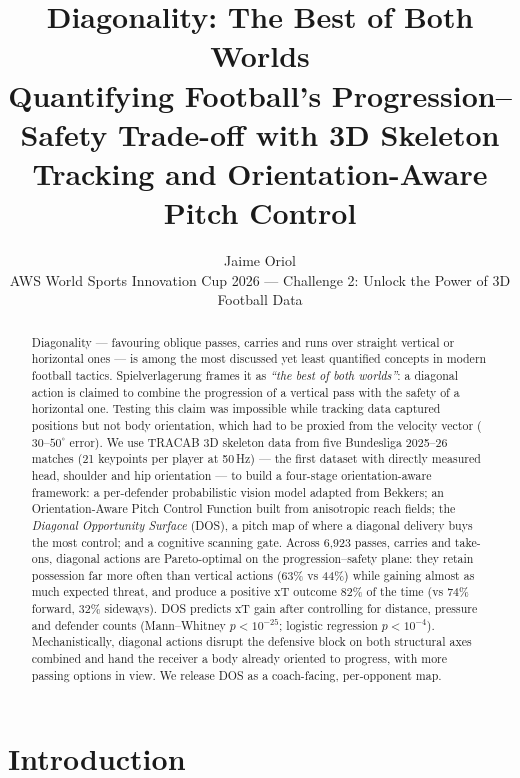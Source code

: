 \documentclass[11pt]{article}
\title{\textbf{Diagonality: The Best of Both Worlds}\\[4pt]
\large Quantifying Football's Progression--Safety Trade-off with 3D Skeleton
Tracking and Orientation-Aware Pitch Control}
\author{Jaime Oriol\\
\small AWS World Sports Innovation Cup 2026 --- Challenge 2: Unlock the Power of 3D Football Data}
\date{}
\begin{document}
\maketitle

\begin{abstract}
\noindent
Diagonality --- favouring oblique passes, carries and runs over straight
vertical or horizontal ones --- is among the most discussed yet least
quantified concepts in modern football tactics. Spielverlagerung frames it
as \emph{``the best of both worlds''}: a diagonal action is claimed to
combine the progression of a vertical pass with the safety of a horizontal
one. Testing this claim was impossible while tracking data captured
positions but not body orientation, which had to be proxied from the
velocity vector ($30$--$50^\circ$ error). We use TRACAB 3D skeleton data
from five Bundesliga 2025--26 matches (21 keypoints per player at
50\,Hz) --- the first dataset with directly measured head, shoulder and hip
orientation --- to build a four-stage orientation-aware framework: a
per-defender probabilistic vision model adapted from Bekkers; an
Orientation-Aware Pitch Control Function built from anisotropic reach
fields; the \emph{Diagonal Opportunity Surface} (DOS), a pitch map of where
a diagonal delivery buys the most control; and a cognitive scanning gate.
Across 6{,}923 passes, carries and take-ons, diagonal actions are
Pareto-optimal on the progression--safety plane: they retain possession far
more often than vertical actions (63\% vs 44\%) while gaining almost as
much expected threat, and produce a positive xT outcome 82\% of the time
(vs 74\% forward, 32\% sideways). DOS predicts xT gain after controlling
for distance, pressure and defender counts (Mann--Whitney $p<10^{-25}$;
logistic regression $p<10^{-4}$). Mechanistically, diagonal actions disrupt
the defensive block on both structural axes combined and hand the receiver
a body already oriented to progress, with more passing options in view. We
release DOS as a coach-facing, per-opponent map.
\end{abstract}

\section{Introduction}
\label{sec:intro}
\end{document}
